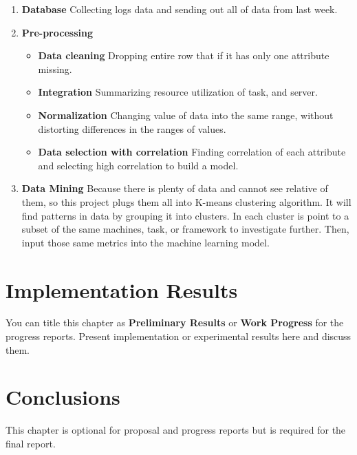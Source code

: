 \documentclass[12pt,oneside,openright,a4paper]{cpe-english-project}
\begin{document}
\begin{enumerate}
\item \textbf{Database } Collecting logs data and sending out all of data from last week.
\item \textbf{Pre-processing}
 \begin{itemize}
   \item \textbf{Data cleaning } Dropping entire row that if it has only one attribute missing. 
   \item \textbf{Integration } Summarizing resource utilization of task, and server.
   \item \textbf{Normalization } Changing value of data into the same range, without distorting differences in the ranges of values.
   \item \textbf{Data selection with correlation } Finding correlation of each attribute and selecting high correlation to build a model.
 \end{itemize}
 \item \textbf{Data Mining } Because there is plenty of data and cannot see relative of them, so this project plugs them all into K-means clustering algorithm. It will find patterns in data by grouping it into clusters. In each cluster is point to a subset of the same machines, task, or framework to investigate further. Then, input those same metrics into the machine learning model.
\end{enumerate}
\chapter{Implementation Results}

You can title this chapter as \textbf{Preliminary Results} or \textbf{Work Progress} for the progress reports. Present implementation or experimental results here and discuss them.

\chapter{Conclusions}

This chapter is optional for proposal and progress reports but 
is required for the final report.
\end{document}
